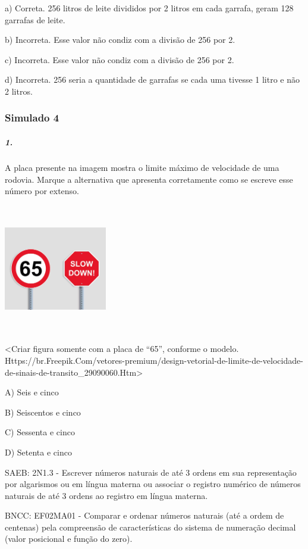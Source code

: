 a) Correta. 256 litros de leite divididos por 2 litros em cada garrafa,
geram 128 garrafas de leite.

b) Incorreta. Esse valor não condiz com a divisão de 256 por 2.

c) Incorreta. Esse valor não condiz com a divisão de 256 por 2.

d) Incorreta. 256 seria a quantidade de garrafas se cada uma tivesse 1
litro e não 2 litros.

\subsubsection{Simulado 4}\label{simulado-4}

\subparagraph{1. }\label{section-145}

A placa presente na imagem mostra o limite máximo de velocidade de uma
rodovia. Marque a alternativa que apresenta corretamente como se escreve
esse número por extenso.

\includegraphics[width=1.77359in,height=2.21876in]{media/image162.png}

\textless{}Criar figura somente com a placa de ``65'', conforme o
modelo.
Https://br.Freepik.Com/vetores-premium/design-vetorial-de-limite-de-velocidade-de-sinais-de-transito\_29090060.Htm\textgreater{}

A) Seis e cinco

B) Seiscentos e cinco

C) Sessenta e cinco

D) Setenta e cinco

SAEB: 2N1.3 - Escrever números naturais de até 3 ordens em sua
representação por algarismos ou em língua materna ou associar o registro
numérico de números naturais de até 3 ordens ao registro em língua
materna.

BNCC: EF02MA01 - Comparar e ordenar números naturais (até a ordem de
centenas) pela compreensão de características do sistema de numeração
decimal (valor posicional e função do zero).

